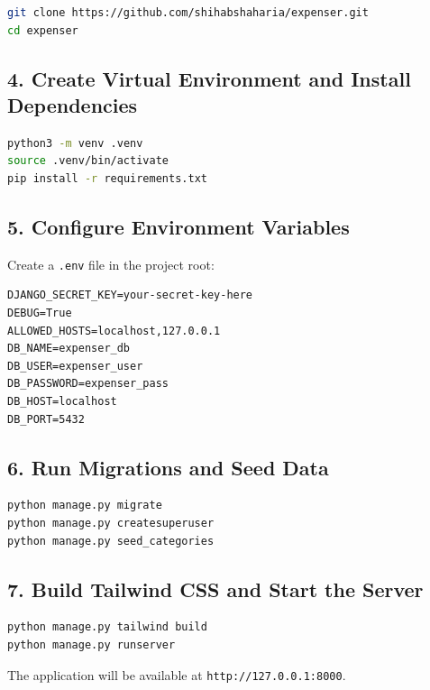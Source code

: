 \documentclass[12pt,a4paper]{report}
\begin{document}
\begin{lstlisting}[language=bash]
git clone https://github.com/shihabshaharia/expenser.git
cd expenser
\end{lstlisting}

\subsection{4. Create Virtual Environment and Install Dependencies}

\begin{lstlisting}[language=bash]
python3 -m venv .venv
source .venv/bin/activate
pip install -r requirements.txt
\end{lstlisting}

\subsection{5. Configure Environment Variables}

Create a \texttt{.env} file in the project root:

\begin{lstlisting}
DJANGO_SECRET_KEY=your-secret-key-here
DEBUG=True
ALLOWED_HOSTS=localhost,127.0.0.1
DB_NAME=expenser_db
DB_USER=expenser_user
DB_PASSWORD=expenser_pass
DB_HOST=localhost
DB_PORT=5432
\end{lstlisting}

\subsection{6. Run Migrations and Seed Data}

\begin{lstlisting}[language=bash]
python manage.py migrate
python manage.py createsuperuser
python manage.py seed_categories
\end{lstlisting}

\subsection{7. Build Tailwind CSS and Start the Server}

\begin{lstlisting}[language=bash]
python manage.py tailwind build
python manage.py runserver
\end{lstlisting}

The application will be available at \texttt{http://127.0.0.1:8000}.

\end{document}
